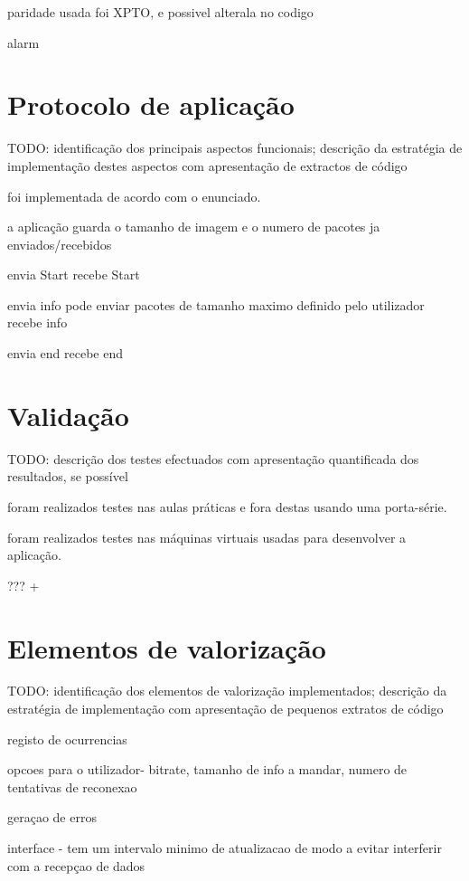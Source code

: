 \documentclass[11pt,a4paper,reqno]{report}
\numberwithin{equation}{section}
\begin{document}
paridade usada foi XPTO, e possivel alterala no codigo

alarm

\chapter{Protocolo de aplicação}

TODO: identificação dos principais aspectos funcionais; descrição da estratégia de implementação destes aspectos com apresentação de extractos de código

foi implementada de acordo com o enunciado.

a aplicação guarda o tamanho de imagem e o numero de pacotes ja enviados/recebidos

envia Start
recebe Start

envia info pode enviar pacotes de tamanho maximo definido pelo utilizador
recebe info

envia end
recebe end


\chapter{Validação}

TODO: descrição dos testes efectuados com apresentação quantificada dos resultados, se possível

foram realizados testes nas aulas práticas e fora destas usando uma porta-série.

foram realizados testes nas máquinas virtuais usadas para desenvolver a aplicação.

??? +


\chapter{Elementos de valorização}

TODO: identificação dos elementos de valorização implementados; descrição da estratégia de implementação com apresentação de pequenos extratos de código

registo de ocurrencias

opcoes para o utilizador-
bitrate,
tamanho de info a mandar,
numero de tentativas de reconexao

geraçao de erros

interface - tem um intervalo minimo de atualizacao de modo a evitar interferir com a recepçao de dados
\end{document}

